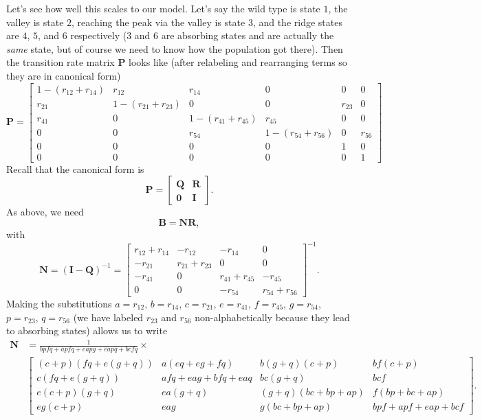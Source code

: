 \documentclass[10pt]{revtex4}
\begin{document}
Let's see how well this scales to our model.
Let's say the wild type is state $1$, the valley is state $2$, reaching the peak via the valley is state $3$, and the ridge states are $4$, $5$, and $6$ respectively ($3$ and $6$ are absorbing states and are actually the \emph{same} state, but of course we need to know how the population got there).
Then the transition rate matrix $\textbf{P}$ looks like (after relabeling and rearranging terms so they are in canonical form)
\begin{equation}
\textbf{P} = 
\begin{bmatrix}
1-(r_{12} + r_{14}) & r_{12} & r_{14} & 0 & 0 & 0 \\
r_{21} & 1 - (r_{21} + r_{23}) & 0 & 0 & r_{23} & 0 \\
r_{41} & 0 & 1 - (r_{41} + r_{45}) & r_{45} & 0 & 0 \\
0 & 0 & r_{54} & 1 - (r_{54} + r_{56}) & 0 & r_{56} \\
0 & 0 & 0 & 0 & 1 & 0 \\
0 & 0 & 0 & 0 & 0 & 1

\end{bmatrix}
\end{equation}
Recall that the canonical form is
\begin{equation}
\textbf{P} = 
\begin{bmatrix}
\textbf{Q} & \textbf{R} \\
\textbf{0} & \textbf{I}
\end{bmatrix}.
\end{equation}
As above, we need
\begin{equation}
\textbf{B} = \textbf{N}\textbf{R},
\end{equation}
with
\begin{equation}
\textbf{N} = (\textbf{I} - \textbf{Q})^{-1} = 
\begin{bmatrix}
r_{12} + r_{14} & -r_{12} & -r_{14} & 0 \\
-r_{21} & r_{21} + r_{23} & 0 & 0 \\
-r_{41} & 0 & r_{41} + r_{45} & -r_{45} \\
0 & 0 & -r_{54} & r_{54} + r_{56}
\end{bmatrix}^{-1}.
\end{equation}
Making the substitutions
$a = r_{12}$,
$b = r_{14}$,
$c = r_{21}$,
$e = r_{41}$,
$f = r_{45}$,
$g = r_{54}$,
$p = r_{23}$,
$q = r_{56}$
(we have labeled $r_{23}$ and $r_{56}$ non-alphabetically because they lead to absorbing states) allows us to write
\begin{align}
\textbf{N} & = \frac{1}{bpfq + apfq + eapg + eapq + bcfq} \times \nonumber \\
& \begin{bmatrix}
(c+p)(fq+e(g+q)) & a(eq + eg + fq) & b(g+q)(c+p) & bf(c+p) \\
c(fq + e(g+q)) & afq+eag+bfq+eaq & bc(g+q) & bcf \\
e(c+p)(g+q) & ea(g+q) & (g+q)(bc+bp+ap) & f(bp+bc+ap) \\
eg(c+p) & eag & g(bc+bp+ap) & bpf + apf + eap + bcf
\end{bmatrix}.
\end{align}
\end{document}
